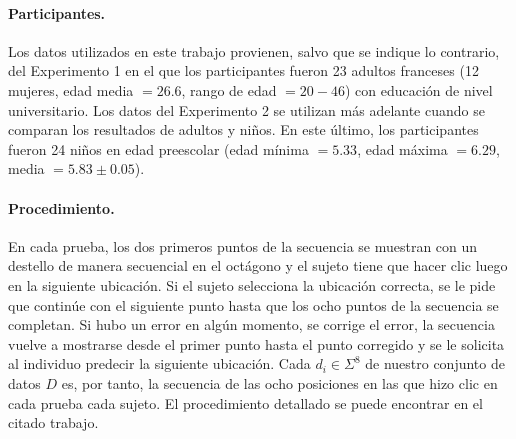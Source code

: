 
\paragraph{Participantes.} Los datos utilizados en este trabajo provienen, salvo que se indique lo contrario, del Experimento 1 en el que los participantes fueron 23 adultos franceses (12 mujeres, edad media $= 26.6$, rango de edad $= 20 - 46$) con educación de nivel universitario. Los datos del Experimento 2 se utilizan más adelante cuando se comparan los resultados de adultos y niños. En este último, los participantes fueron 24 niños en edad preescolar (edad mínima $= 5.33$, edad máxima $= 6.29$, media $= 5.83 \pm 0.05$).


\paragraph{Procedimiento.} En cada prueba, los dos primeros puntos de la secuencia se muestran con un destello de manera secuencial en el octágono y el sujeto tiene que hacer clic luego en la siguiente ubicación. Si el sujeto selecciona la ubicación correcta, se le pide que continúe con el siguiente punto hasta que los ocho puntos de la secuencia se completan. Si hubo un error en algún momento, se corrige el error, la secuencia vuelve a mostrarse desde el primer punto hasta el punto corregido y se le solicita al individuo predecir la siguiente ubicación. Cada $d_i \in \Sigma^8$ de nuestro conjunto de datos $D$ es, por tanto, la secuencia de las ocho posiciones en las que hizo clic en cada prueba cada sujeto. El procedimiento detallado se puede encontrar en el citado trabajo.

